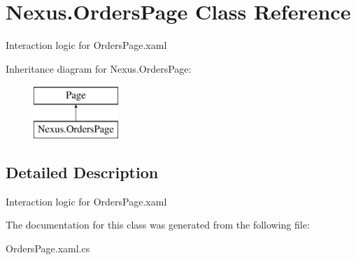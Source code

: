 \hypertarget{class_nexus_1_1_orders_page}{}\section{Nexus.\+Orders\+Page Class Reference}
\label{class_nexus_1_1_orders_page}


Interaction logic for Orders\+Page.\+xaml  


Inheritance diagram for Nexus.\+Orders\+Page\+:\begin{figure}[H]
\begin{center}
\leavevmode
\includegraphics[height=2.000000cm]{class_nexus_1_1_orders_page}
\end{center}
\end{figure}


\subsection{Detailed Description}
Interaction logic for Orders\+Page.\+xaml 



The documentation for this class was generated from the following file\+:\begin{DoxyCompactItemize}
\item 
Orders\+Page.\+xaml.\+cs\end{DoxyCompactItemize}
